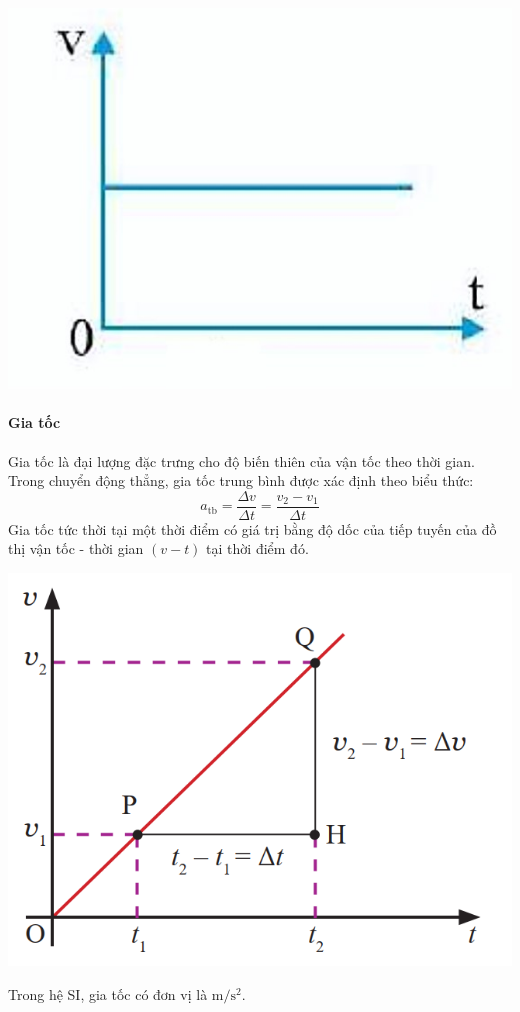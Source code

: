 \begin{tomtat}
	\begin{center}
		\includegraphics[scale=0.4]{figs/G10Y25B6-3}
	\end{center}
	\paragraph{Gia tốc}
	Gia tốc là đại lượng đặc trưng cho độ biến thiên của vận tốc theo thời gian. Trong chuyển động thẳng, gia tốc trung bình được xác định theo biểu thức:
	$$a_\text{tb}=\dfrac{\Delta v}{\Delta t}=\dfrac{v_2-v_1}{\Delta t}$$
	Gia tốc tức thời tại một thời điểm có giá trị bằng độ dốc của tiếp tuyến của đồ thị vận tốc - thời gian $\left(v - t\right)$ tại thời điểm đó.
	\begin{center}
		\includegraphics[scale=0.6]{figs/G10Y25B6-2}
		\label{fig:8.2}
	\end{center}
	Trong hệ SI, gia tốc có đơn vị là $\si{\meter/\second^2}$.

\end{tomtat}
